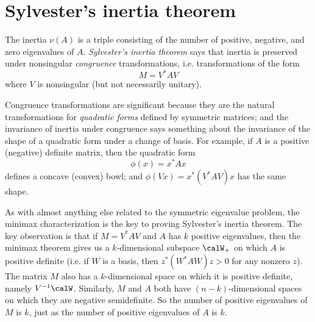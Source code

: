 \section{Sylvester's inertia theorem}

The inertia $\nu(A)$ is a triple consisting of the number of positive,
negative, and zero eigenvalues of $A$.  {\em Sylvester's inertia
  theorem} says that inertia is preserved under nonsingular {\em
  congruence} transformations, i.e. transformations of the form
\[
  M = V^* A V
\]
where $V$ is nonsingular (but not necessarily unitary).

Congruence transformations are significant because they are the natural
transformations for {\em quadratic forms} defined by symmetric matrices;
and the invariance of inertia under congruence says something about the
invariance of the shape of a quadratic form under a change of basis.
For example, if $A$ is a positive (negative) definite matrix, then the
quadratic form
\[
  \phi(x) = x^* A x
\]
defines a concave (convex) bowl; and $\phi(Vx) = x^* (V^* A V) x$ has
the same shape.

As with almost anything else related to the symmetric eigenvalue
problem, the minimax characterization is the key to proving
Sylvester's inertia theorem.  The key observation is that if
$M = V^* A V$ and $A$ has $k$ positive eigenvalues, then the minimax theorem
gives us a $k$-dimensional subspace $\calW_+$ on which $A$ is positive
definite (i.e. if $W$ is a basis, then $z^* (W^* A W) z > 0$ for any
nonzero $z$).  The matrix $M$ also has a $k$-dimensional space on
which it is positive definite, namely $V^{-1} \calW$.  Similarly, $M$
and $A$ both have $(n-k)$-dimensional spaces on which they are
negative semidefinite.  So the number of positive eigenvalues of $M$
is $k$, just as the number of positive eigenvalues of $A$ is $k$.
